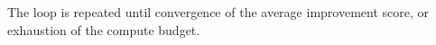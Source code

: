 The loop is repeated until convergence of the average improvement score, or exhaustion of the compute budget. 











